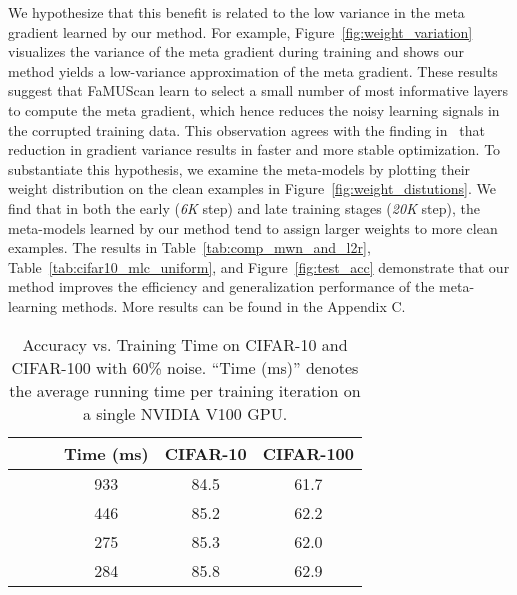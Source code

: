 \documentclass[final]{cvpr}
\newcommand{\methodnameabbre}{FaMUS}
\begin{document}
We hypothesize that this benefit is related to the low variance in the meta gradient learned by our method. For example, Figure~\ref{fig:weight_variation} visualizes the variance of the meta gradient during training and shows our method yields a low-variance approximation of the meta gradient. These results suggest that \methodnameabbre\space can learn to select a small number of most informative layers to compute the meta gradient, which hence reduces the noisy learning signals in the corrupted training data. This observation agrees with the finding in~\cite{neelakantan2015adding, miller2017reducing} that reduction in gradient variance results in faster and more stable optimization.
To substantiate this hypothesis, we examine the meta-models by plotting their weight distribution on the clean examples in Figure~\ref{fig:weight_distutions}. We find that in both the early (\textit{6K} step) and late training stages (\textit{20K} step), the meta-models learned by our method tend to assign larger weights to more clean examples.
The results in Table~\ref{tab:comp_mwn_and_l2r}, Table~\ref{tab:cifar10_mlc_uniform}, and  Figure~\ref{fig:test_acc} demonstrate that our method improves the efficiency and generalization performance of the meta-learning methods. More results can be found in the Appendix C.

\begin{table}[t]
	\centering
	\small
	\begin{tabular}{|ccc|c|c|c|}
		\hline
		 &  &  & Time (ms) &CIFAR-10 & CIFAR-100 \\
		\hline
		\checkmark &  &                      & 933  & 84.5  & 61.7 \\
		\hline
		\checkmark &          & \checkmark   & 446  & 85.2 & 62.2 \\
		\hline
		\checkmark & \checkmark &            & 275  & 85.3 & 62.0   \\
		\hline
		\checkmark & \checkmark & \checkmark & 284   & 85.8 & 62.9 \\
		\hline
	\end{tabular}
	\vspace{-1mm}
	\caption{Accuracy vs. Training Time on CIFAR-10 and CIFAR-100 with 60\% noise. 
	``Time (ms)'' denotes the average running time per training iteration on a single NVIDIA V100 GPU. 
	}\label{tab:ablation_loss_function}
\end{table}
 
\end{document}
